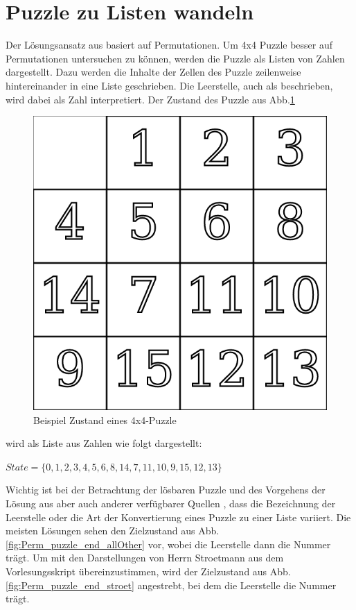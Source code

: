 \section{Puzzle zu Listen wandeln} %
\label{sec:PuzzleToList}
Der Lösungsansatz aus \autocite{Unsolvable-14-15-Numberphile-YT:online} basiert auf Permutationen. Um 4x4 Puzzle besser auf Permutationen untersuchen zu können, werden die Puzzle als Listen von Zahlen dargestellt. Dazu werden die Inhalte der Zellen des Puzzle zeilenweise hintereinander in eine Liste geschrieben. Die Leerstelle, auch als  beschrieben, wird dabei als Zahl  interpretiert.
Der Zustand des Puzzle aus Abb.\ref{fig:Perm_puzzle_start_Pic}
\begin{figure}[H]
	\centering
	\includegraphics[width=.5\textwidth,keepaspectratio]{img/Start_Puzzle2.png}
	\captionsetup{format=hang}
	\caption{Beispiel Zustand eines 4x4-Puzzle \label{fig:Perm_puzzle_start_Pic}}
\end{figure}
\begin{minipage}{\linewidth}
	wird als Liste aus Zahlen wie folgt dargestellt:
	\begin{center}
		$State = \{0,1,2,3,4,5,6,8,14,7,11,10,9,15,12,13\}$
	\end{center}
\end{minipage}\WNL%
Wichtig ist bei der Betrachtung der lösbaren Puzzle und des Vorgehens der Lösung aus \autocite{Unsolvable-14-15-Numberphile-YT:online} aber auch anderer verfügbarer Quellen \autocite{solving-15-puzzle-lvi:article,geeksforgeeks:online,archer-15-puzzle:article}, dass die Bezeichnung der Leerstelle oder die Art der Konvertierung eines Puzzle zu einer Liste variiert. Die meisten Lösungen sehen den Zielzustand aus Abb.\ref{fig:Perm_puzzle_end_allOther} vor, wobei die Leerstelle dann die Nummer  trägt. Um mit den Darstellungen von Herrn Stroetmann aus dem Vorlesungsskript \autocite{github-stroetmann:online} übereinzustimmen, wird der Zielzustand aus Abb.\ref{fig:Perm_puzzle_end_stroet} angestrebt, bei dem die Leerstelle die Nummer  trägt.\\
